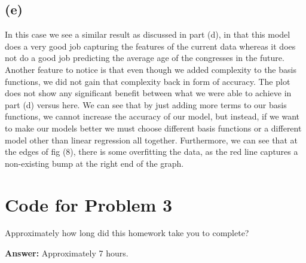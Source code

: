 \documentclass[submit]{harvardml}
\begin{document}
\subsection*{(e)}
In this case we see a similar result as discussed in part (d), in that this model does a very good job capturing the features of the current data whereas it does not do a good job predicting the average age of the congresses in the future. Another feature to notice is that even though we added complexity to the basis functions, we did not gain that complexity back in form of accuracy. The plot does not show any significant benefit between what we were able to achieve in part (d) versus here. We can see that by just adding more terms to our basis functions, we cannot increase the accuracy of our model, but instead, if we want to make our models better we must choose different basis functions or a different model other than linear regression all together. Furthermore, we can see that at the edges of fig (8), there is some overfitting the data, as the red line captures a non-existing bump at the right end of the graph.
\newpage
\section*{Code for Problem 3}


\newpage
\begin{problem}[Calibration, 1pt]
Approximately how long did this homework take you to complete?
\end{problem}
\textbf{Answer:}
Approximately 7 hours.
\end{document}
